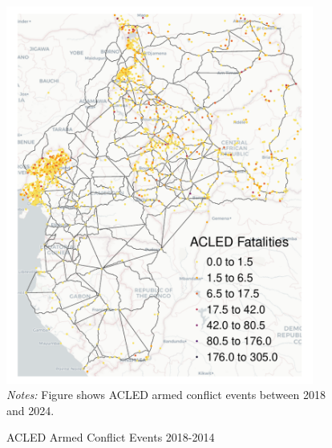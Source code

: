 \documentclass[a4paper]{article}
\begin{document}
\begin{figure}[H] \vspace{-1mm}
\centering
\caption{\label{fig:ACLED} ACLED Armed Conflict Events 2018-2014} 
\vspace{2mm}
\includegraphics[width=0.9\textwidth]{"../figures/trans_CEMAC_network_ACLED.pdf"} \\
\scriptsize 
\emph{Notes:} Figure shows ACLED \citep{raleigh2023political} armed conflict events between 2018 and 2024.
\end{figure}
\end{document}
